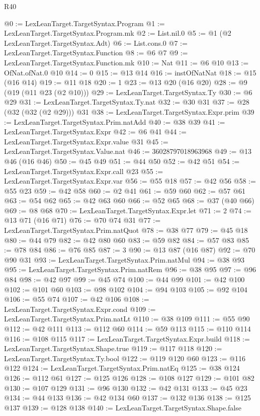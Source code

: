 \begin{lexlean}{R40}
\begin{coremodule}
@0 := LexLeanTarget.TargetSyntax.Program
@1 := LexLeanTarget.TargetSyntax.Program.mk
@2 := List.nil.{0}
@5 := @1 (@2 LexLeanTarget.TargetSyntax.Adt)
@6 := List.cons.{0}
@7 := LexLeanTarget.TargetSyntax.Function
@8 := @6 @7
@9 := LexLeanTarget.TargetSyntax.Function.mk
@10 := Nat
@11 := @6 @10
@13 := OfNat.ofNat.{0} @10
@14 := 0
@15 := @13 @14
@16 := instOfNatNat
@18 := @15 (@16 @14)
@19 := @11 @18
@20 := 1
@23 := @13 @20 (@16 @20)
@28 := @9 (@19 (@11 @23 (@2 @10)))
@29 := LexLeanTarget.TargetSyntax.Ty
@30 := @6 @29
@31 := LexLeanTarget.TargetSyntax.Ty.nat
@32 := @30 @31
@37 := @28 (@32 (@32 (@2 @29))) @31
@38 := LexLeanTarget.TargetSyntax.Expr.prim
@39 := LexLeanTarget.TargetSyntax.Prim.natAdd
@40 := @38 @39
@41 := LexLeanTarget.TargetSyntax.Expr
@42 := @6 @41
@44 := LexLeanTarget.TargetSyntax.Expr.value @31
@45 := LexLeanTarget.TargetSyntax.Value.nat
@46 := 36028797018963968
@49 := @13 @46 (@16 @46)
@50 := @45 @49
@51 := @44 @50
@52 := @42 @51
@54 := LexLeanTarget.TargetSyntax.Expr.call @23
@55 := LexLeanTarget.TargetSyntax.Expr.var
@56 := @55 @18
@57 := @42 @56
@58 := @55 @23
@59 := @42 @58
@60 := @2 @41
@61 := @59 @60
@62 := @57 @61
@63 := @54 @62
@65 := @42 @63 @60
@66 := @52 @65
@68 := @37 (@40 @66)
@69 := @8 @68
@70 := LexLeanTarget.TargetSyntax.Expr.let
@71 := 2
@74 := @13 @71 (@16 @71)
@76 := @70 @74 @31
@77 := LexLeanTarget.TargetSyntax.Prim.natQuot
@78 := @38 @77
@79 := @45 @18
@80 := @44 @79
@82 := @42 @80 @60
@83 := @59 @82
@84 := @57 @83
@85 := @78 @84
@86 := @76 @85
@87 := 3
@90 := @13 @87 (@16 @87)
@92 := @70 @90 @31
@93 := LexLeanTarget.TargetSyntax.Prim.natMul
@94 := @38 @93
@95 := LexLeanTarget.TargetSyntax.Prim.natRem
@96 := @38 @95
@97 := @96 @84
@98 := @42 @97
@99 := @45 @74
@100 := @44 @99
@101 := @42 @100
@102 := @101 @60
@103 := @98 @102
@104 := @94 @103
@105 := @92 @104
@106 := @55 @74
@107 := @42 @106
@108 := LexLeanTarget.TargetSyntax.Expr.cond
@109 := LexLeanTarget.TargetSyntax.Prim.natLt
@110 := @38 @109
@111 := @55 @90
@112 := @42 @111
@113 := @112 @60
@114 := @59 @113
@115 := @110 @114
@116 := @108 @115
@117 := LexLeanTarget.TargetSyntax.Expr.build
@118 := LexLeanTarget.TargetSyntax.Shape.true
@119 := @117 @118
@120 := LexLeanTarget.TargetSyntax.Ty.bool
@122 := @119 @120 @60
@123 := @116 @122
@124 := LexLeanTarget.TargetSyntax.Prim.natEq
@125 := @38 @124
@126 := @112 @61
@127 := @125 @126
@128 := @108 @127
@129 := @101 @82
@130 := @107 @129
@131 := @96 @130
@132 := @42 @131
@133 := @45 @23
@134 := @44 @133
@136 := @42 @134 @60
@137 := @132 @136
@138 := @125 @137
@139 := @128 @138
@140 := LexLeanTarget.TargetSyntax.Shape.false

\end{coremodule}
\end{lexlean}
